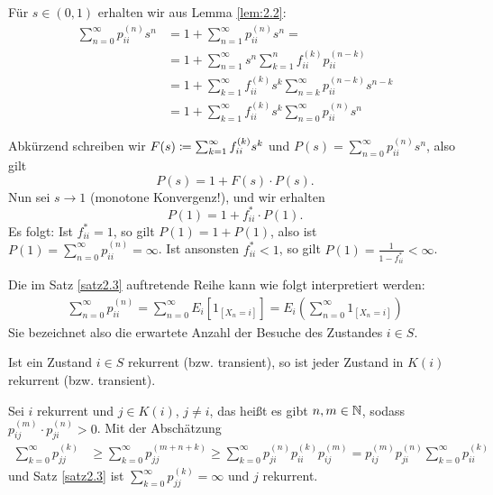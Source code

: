 \documentclass[a4paper,twoside,DIV15,BCOR12mm]{scrbook}
\begin{document}
\begin{beweis}
Für $s\in(0,1)$ erhalten wir aus Lemma \ref{lem:2.2}:
\begin{align*}
\sum_{n=0}^\infty p_{ii}^{(n)} s^n &= 1 + \sum_{n=1}^\infty p_{ii}^{(n)} s^n = \\
&= 1 + \sum_{n=1}^\infty s^n\sum_{k=1}^n f_{ii}^{(k)}p_{ii}^{(n-k)} \\
&= 1 + \sum_{k=1}^\infty f_{ii}^{(k)} s^k \sum_{n=k}^\infty p_{ii}^{(n-k)} s^{n-k} \\
&= 1 + \sum_{k=1}^\infty f_{ii}^{(k)} s^k \sum_{n=0}^\infty p_{ii}^{(n)} s^{n} 
\end{align*}

Abkürzend schreiben wir $F(s)\da \sum_{k=1}^\infty f_{ii}^{(k)} s^k$ und $P(s)=\sum_{n=0}^\infty p_{ii}^{(n)} s^{n}$, also gilt \[P(s) = 1 + F(s)\cdot P(s).\]
Nun sei $s\to 1$ (monotone Konvergenz!), und wir erhalten
\[
P(1) = 1 + f_{ii}^*\cdot P(1).
\]
Es folgt: Ist $f_{ii}^* = 1$, so gilt $P(1) = 1 + P(1)$, also ist $P(1) = \sum_{n=0}^\infty p_{ii}^{(n)} = \infty$. Ist ansonsten $f_{ii}^{*}<1$, so gilt $P(1) = \frac1{1-f_{ii}^*} < \infty$.
\end{beweis}

\begin{bemerkung}
Die im Satz \ref{satz2.3} auftretende Reihe kann wie folgt interpretiert werden:
\begin{align*}
\sum_{n=0}^\infty p_{ii}^{(n)}
= \sum_{n=0}^\infty E_i[1_{[X_n=i]}]
= E_i(\sum_{n=0}^\infty 1_{[X_n=i]})
\end{align*}
Sie bezeichnet also die erwartete Anzahl der Besuche des Zustandes $i\in S$.
\end{bemerkung}

\begin{satz}[Solidaritätsprinzip]
Ist ein Zustand $i\in S$ rekurrent (bzw. transient), so ist jeder Zustand in $K(i)$ rekurrent (bzw. transient).
\end{satz}

\begin{beweis}
Sei $i$ rekurrent und $j\in K(i)$, $j\ne i$, das heißt es gibt $n,m\in \mathbb{N}$, sodass $p_{ij}^{(m)}\cdot p_{ji}^{(n)}>0$.
Mit der Abschätzung
\begin{align*}
\sum_{k=0}^\infty p_{jj}^{(k)} 
&\ge \sum_{k=0}^\infty p_{jj}^{(m+n+k)} 
\ge \sum_{k=0}^\infty p_{ji}^{(n)} p_{ii}^{(k)} p_{ij}^{(m)}
= p_{ij}^{(m)} p_{ji}^{(n)} \sum_{k=0}^\infty p_{ii}^{(k)}
\end{align*}
und Satz \ref{satz2.3} ist $\sum_{k=0}^\infty p_{jj}^{(k)}=\infty$ und $j$ rekurrent.
\end{beweis}
\end{document}
